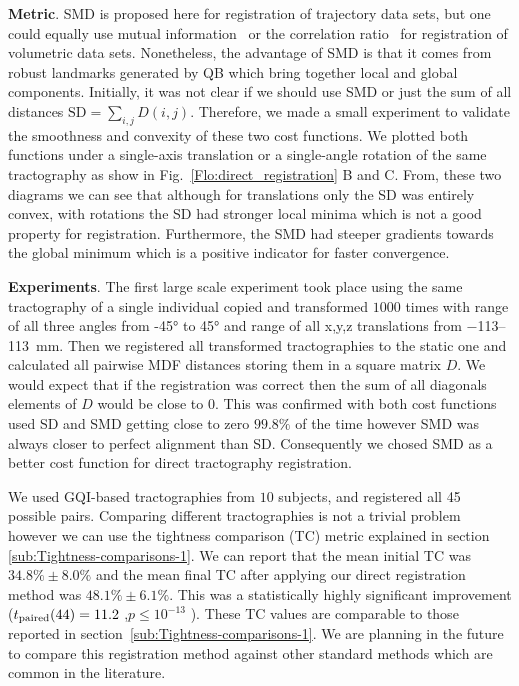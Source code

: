 \documentclass[preprint,authoryear,a4paper,10pt,onecolumn]{elsarticle}
\begin{document}
\textbf{Metric}. SMD is proposed here for registration of trajectory
data sets, but one could equally use mutual
information~\citep{maes1997multimodality} or the correlation
ratio~\citep{roche1998correlation} for registration of volumetric data
sets. Nonetheless, the advantage of SMD is that it comes from robust
landmarks generated by QB which bring together local and global
components. Initially, it was not clear if we should use SMD or just the
sum of all distances $\mathrm{SD}=\sum_{i,j}D(i,j)$. Therefore, we made
a small experiment to validate the smoothness and convexity of these two
cost functions. We plotted both functions under a single-axis
translation or a single-angle rotation of the same tractography as show
in Fig.~\ref{Flo:direct_registration} B and C. From, these two diagrams
we can see that although for translations only the SD was entirely
convex, with rotations the SD had stronger local minima which is not a
good property for registration. Furthermore, the SMD had steeper
gradients towards the global minimum which is a positive indicator for
faster convergence.

\textbf{Experiments}. The first large scale experiment took place using
the same tractography of a single individual copied and transformed
$1000$ times with range of all three angles from \ang{-45} to \ang{45}
and range of all x,y,z translations from \numrange{-113}{113}~mm. Then
we registered all transformed tractographies to the static one and
calculated all pairwise MDF distances storing them in a square matrix
$D$. We would expect that if the registration was correct then the sum
of all diagonals elements of $D$ would be close to $0$. This was
confirmed with both cost functions used SD and SMD getting close to zero
$99.8\%$ of the time however SMD was always closer to perfect alignment
than SD. Consequently we chosed SMD as a better cost function for direct
tractography registration.

We used GQI-based tractographies from $10$ subjects, and registered all
45 possible pairs. Comparing different tractographies is not a trivial
problem however we can use the tightness comparison (TC) metric
explained in section \ref{sub:Tightness-comparisons-1}.  We can report
that the mean initial TC was $34.8\%\pm8.0\%$ and the mean final TC
after applying our direct registration method was $48.1\%\pm6.1\%$. This
was a statistically highly significant improvement
($t_{\text{\textrm{paired}}}(44)=11.2$ ,$p\leq10^{-13}$ ). These TC
values are comparable to those reported in
section~\ref{sub:Tightness-comparisons-1}. We are planning in the future
to compare this registration method against other standard methods which
are common in the literature.
\end{document}
